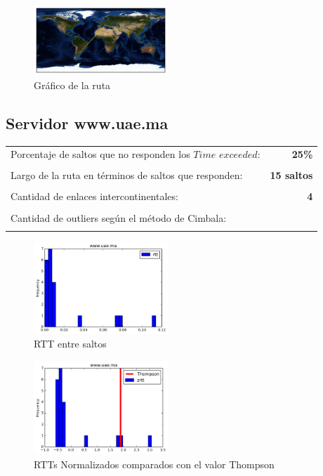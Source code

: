 \begin{figure}[H]
  \centering
    \includegraphics[width=0.45\textwidth]{grafico-rutas/invertisuniversity-ac-in.png}
  \caption{Gráfico de la ruta}
  \label{entropia-s}
\end{figure}




\subsection{Servidor www.uae.ma}

\begin{center}
\begin{tabular}{p{6.5cm}r}
Porcentaje de saltos que no responden los $Time$ $exceeded$: & \textbf{25\%} \\ \\ 
Largo de la ruta en términos de saltos que responden: &\textbf{15 saltos} \\ \\
Cantidad de enlaces intercontinentales: & \textbf{4} \\ \\
Cantidad de outliers según el método de Cimbala: & \textbf{} \\ \\
\end{tabular}
\end{center}


\begin{figure}[H]
  \centering
    \includegraphics[width=0.45\textwidth]{histogramas_rtt/www-uae-ma.png}
  \caption{RTT entre saltos}
  \label{entropia-s}
\end{figure}

\begin{figure}[H]
  \centering
    \includegraphics[width=0.45\textwidth]{histogramas_thompson/www-uae-ma.png}
  \caption{RTTs Normalizados comparados con el valor Thompson}
  \label{entropia-s}
\end{figure}


